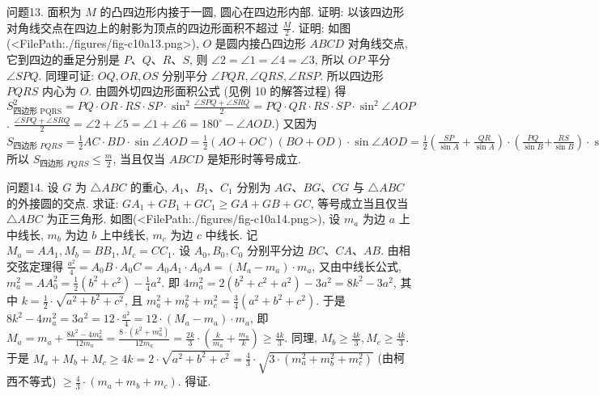 问题13. 面积为 $M$ 的凸四边形内接于一圆, 圆心在四边形内部.
证明: 以该四边形对角线交点在四边上的射影为顶点的四边形面积不超过 $\frac{M}{2}$.
证明: 如图(<FilePath:./figures/fig-c10a13.png>), $O$ 是圆内接凸四边形 $A B C D$ 对角线交点, 它到四边的垂足分别是 $P 、 Q 、 R 、 S$, 则 $\angle 2=\angle 1=\angle 4=\angle 3$, 所以 $O P$ 平分 $\angle S P Q$.
同理可证: $O Q, O R, O S$ 分别平分 $\angle P Q R, \angle Q R S, \angle R S P$. 所以四边形 $P Q R S$ 内心为 $O$. 由圆外切四边形面积公式 (见例 10 的解答过程) 得
$S_{\text {四边形 } \mathrm{PQRS}}^2=P Q \cdot O R \cdot R S \cdot S P \cdot \sin ^2 \frac{\angle S P Q+\angle S R Q}{2}= P Q \cdot Q R \cdot R S \cdot S P \cdot \sin ^2 \angle A O P$.
$\frac{\angle S P Q+\angle S R Q}{2}= \angle 2+\angle 5=\angle 1+\angle 6=180^{\circ}-\angle A O D$.) 又因为 $S_{\text {四边形 } P Q R S}=\frac{1}{2} A C \cdot B D \cdot \sin \angle A O D=\frac{1}{2}(A O+ O C)(B O+O D) \cdot \sin \angle A O D=\frac{1}{2}\left(\frac{S P}{\sin A}+\frac{Q R}{\sin A}\right) \cdot\left(\frac{P Q}{\sin B}\right.\left.+\frac{R S}{\sin B}\right) \cdot \sin \angle A O D \geqslant \frac{4 \sqrt{P Q \cdot Q R \cdot R S \cdot S P} \sin \angle A O D}{2 \sin A \sin B}=\frac{2 S_{\text {四边形PQRS }}}{\sin A \sin B} \geqslant$
所以 $S_{\text {四边形 } P Q R S} \leqslant \frac{m}{2}$, 当且仅当 $A B C D$ 是矩形时等号成立.



问题14. 设 $G$ 为 $\triangle A B C$ 的重心, $A_1 、 B_1 、 C_1$ 分别为 $A G 、 B G 、 C G$ 与 $\triangle A B C$ 的外接圆的交点.
求证: $G A_1+G B_1+G C_1 \geqslant G A+G B+G C$, 等号成立当且仅当 $\triangle A B C$ 为正三角形.
如图(<FilePath:./figures/fig-c10a14.png>), 设 $m_a$ 为边 $a$ 上中线长, $m_b$ 为边 $b$ 上中线长, $m_c$ 为边 $c$ 中线长.
记 $M_a=A A_1, M_b=B B_1, M_c= C C_1$. 设 $A_0, B_0, C_0$ 分别平分边 $B C 、 C A 、 A B$. 由相交弦定理得 $\frac{a^2}{4}=A_0 B \cdot A_0 C=A_0 A_1 \cdot A_0 A=\left(M_a-\right. \left.m_a\right) \cdot m_a$, 又由中线长公式, $m_a^2=A A_0^2=\frac{1}{2}\left(b^2+c^2\right)- \frac{1}{4} a^2$. 即 $4 m_a^2=2\left(b^2+c^2+a^2\right)-3 a^2=8 k^2-3 a^2$, 其中
$k=\frac{1}{2} \cdot \sqrt{a^2+b^2+c^2}$, 且 $m_a^2+m_b^2+m_c^2=\frac{3}{4}\left(a^2+\right. \left.b^2+c^2\right)$.
于是 $8 k^2-4 m_a^2=3 a^2=12 \cdot \frac{a^2}{4}=12 \cdot\left(M_a-m_a\right) \cdot m_a$, 即 $M_a=m_a+ \frac{8 k^2-4 m_a^2}{12 m_a}=\frac{8 \cdot\left(k^2+m_a^2\right)}{12 m_a}=\frac{2 k}{3} \cdot\left(\frac{k}{m_a}+\frac{m_a}{k}\right) \geqslant \frac{4 k}{3}$.
同理, $M_b \geqslant \frac{4 k}{3}, M_c \geqslant \frac{4 k}{3}$.
于是 $M_a+M_b+M_c \geqslant 4 k=2 \cdot \sqrt{a^2+b^2+c^2}=\frac{4}{3} \cdot \sqrt{3 \cdot\left(m_a^2+m_b^2+m_c^2\right)}$ (由柯西不等式) $\geqslant \frac{4}{3} \cdot\left(m_a+m_b+m_c\right)$. 得证.



